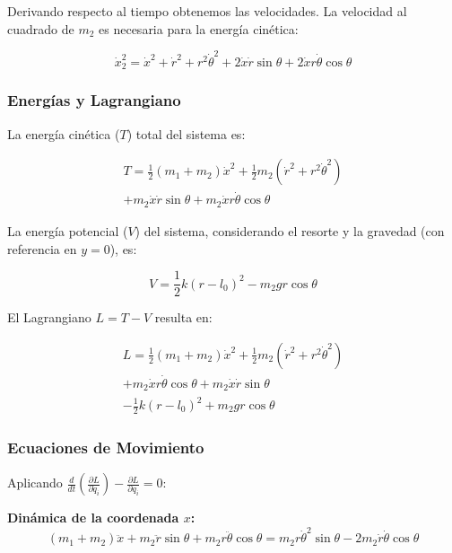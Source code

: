 \documentclass[conference]{IEEEtran}
\begin{document}
Derivando respecto al tiempo obtenemos las velocidades. La velocidad al cuadrado de $m_2$ es necesaria para la energía cinética:

\begin{equation}
\dot{x}_2^2 = \dot{x}^2 + \dot{r}^2 + r^2\dot{\theta}^2 + 2\dot{x}\dot{r}\sin\theta + 2\dot{x}r\dot{\theta}\cos\theta
\end{equation}

\subsubsection{Energías y Lagrangiano}

La energía cinética ($T$) total del sistema es:

\begin{equation}
\begin{split}
T = \frac{1}{2}(m_1 + m_2)\dot{x}^2 + \frac{1}{2}m_2(\dot{r}^2 + r^2\dot{\theta}^2) \\
+ m_2\dot{x}\dot{r}\sin\theta + m_2\dot{x}r\dot{\theta}\cos\theta
\end{split}
\end{equation}

La energía potencial ($V$) del sistema, considerando el resorte y la gravedad (con referencia en $y = 0$), es:

\begin{equation}
V = \frac{1}{2}k(r - l_0)^2 - m_2gr\cos\theta
\end{equation}

El Lagrangiano $L = T - V$ resulta en:

\begin{equation}
\begin{split}
L = \frac{1}{2}(m_1 + m_2)\dot{x}^2 + \frac{1}{2}m_2(\dot{r}^2 + r^2\dot{\theta}^2) \\
+ m_2\dot{x}r\dot{\theta}\cos\theta + m_2\dot{x}\dot{r}\sin\theta \\
- \frac{1}{2}k(r - l_0)^2 + m_2gr\cos\theta
\end{split}
\end{equation}

\subsubsection{Ecuaciones de Movimiento}

Aplicando $\frac{d}{dt}\left(\frac{\partial L}{\partial \dot{q}_i}\right) - \frac{\partial L}{\partial q_i} = 0$:

\textbf{Dinámica de la coordenada $x$:}
\begin{equation}
(m_1 + m_2)\ddot{x} + m_2\ddot{r}\sin\theta + m_2r\ddot{\theta}\cos\theta = m_2r\dot{\theta}^2\sin\theta - 2m_2\dot{r}\dot{\theta}\cos\theta
\end{equation}
\end{document}
